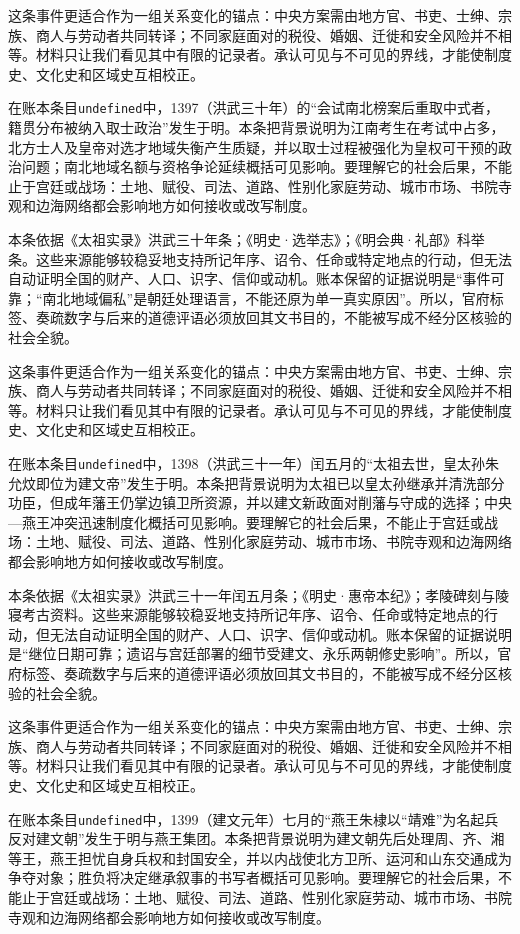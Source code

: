 这条事件更适合作为一组关系变化的锚点：中央方案需由地方官、书吏、士绅、宗族、商人与劳动者共同转译；不同家庭面对的税役、婚姻、迁徙和安全风险并不相等。材料只让我们看见其中有限的记录者。承认可见与不可见的界线，才能使制度史、文化史和区域史互相校正。

在账本条目\texttt{undefined}中，1397（洪武三十年）的“会试南北榜案后重取中式者，籍贯分布被纳入取士政治”发生于明。本条把背景说明为江南考生在考试中占多，北方士人及皇帝对选才地域失衡产生质疑，并以取士过程被强化为皇权可干预的政治问题；南北地域名额与资格争论延续概括可见影响。要理解它的社会后果，不能止于宫廷或战场：土地、赋役、司法、道路、性别化家庭劳动、城市市场、书院寺观和边海网络都会影响地方如何接收或改写制度。

本条依据《太祖实录》洪武三十年条；《明史·选举志》；《明会典·礼部》科举条。这些来源能够较稳妥地支持所记年序、诏令、任命或特定地点的行动，但无法自动证明全国的财产、人口、识字、信仰或动机。账本保留的证据说明是“事件可靠；“南北地域偏私”是朝廷处理语言，不能还原为单一真实原因”。所以，官府标签、奏疏数字与后来的道德评语必须放回其文书目的，不能被写成不经分区核验的社会全貌。

这条事件更适合作为一组关系变化的锚点：中央方案需由地方官、书吏、士绅、宗族、商人与劳动者共同转译；不同家庭面对的税役、婚姻、迁徙和安全风险并不相等。材料只让我们看见其中有限的记录者。承认可见与不可见的界线，才能使制度史、文化史和区域史互相校正。

在账本条目\texttt{undefined}中，1398（洪武三十一年）闰五月的“太祖去世，皇太孙朱允炆即位为建文帝”发生于明。本条把背景说明为太祖已以皇太孙继承并清洗部分功臣，但成年藩王仍掌边镇卫所资源，并以建文新政面对削藩与守成的选择；中央—燕王冲突迅速制度化概括可见影响。要理解它的社会后果，不能止于宫廷或战场：土地、赋役、司法、道路、性别化家庭劳动、城市市场、书院寺观和边海网络都会影响地方如何接收或改写制度。

本条依据《太祖实录》洪武三十一年闰五月条；《明史·惠帝本纪》；孝陵碑刻与陵寝考古资料。这些来源能够较稳妥地支持所记年序、诏令、任命或特定地点的行动，但无法自动证明全国的财产、人口、识字、信仰或动机。账本保留的证据说明是“继位日期可靠；遗诏与宫廷部署的细节受建文、永乐两朝修史影响”。所以，官府标签、奏疏数字与后来的道德评语必须放回其文书目的，不能被写成不经分区核验的社会全貌。

这条事件更适合作为一组关系变化的锚点：中央方案需由地方官、书吏、士绅、宗族、商人与劳动者共同转译；不同家庭面对的税役、婚姻、迁徙和安全风险并不相等。材料只让我们看见其中有限的记录者。承认可见与不可见的界线，才能使制度史、文化史和区域史互相校正。

在账本条目\texttt{undefined}中，1399（建文元年）七月的“燕王朱棣以“靖难”为名起兵反对建文朝”发生于明与燕王集团。本条把背景说明为建文朝先后处理周、齐、湘等王，燕王担忧自身兵权和封国安全，并以内战使北方卫所、运河和山东交通成为争夺对象；胜负将决定继承叙事的书写者概括可见影响。要理解它的社会后果，不能止于宫廷或战场：土地、赋役、司法、道路、性别化家庭劳动、城市市场、书院寺观和边海网络都会影响地方如何接收或改写制度。

